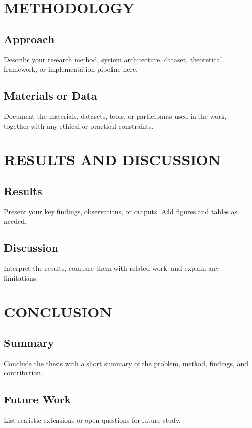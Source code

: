 \chapter{METHODOLOGY}

\section{Approach}

Describe your research method, system architecture, dataset, theoretical framework, or implementation pipeline here.

\section{Materials or Data}

Document the materials, datasets, tools, or participants used in the work, together with any ethical or practical constraints.

\chapter{RESULTS AND DISCUSSION}

\section{Results}

Present your key findings, observations, or outputs. Add figures and tables as needed.

\section{Discussion}

Interpret the results, compare them with related work, and explain any limitations.

\chapter{CONCLUSION}

\section{Summary}

Conclude the thesis with a short summary of the problem, method, findings, and contribution.

\section{Future Work}

List realistic extensions or open questions for future study.
